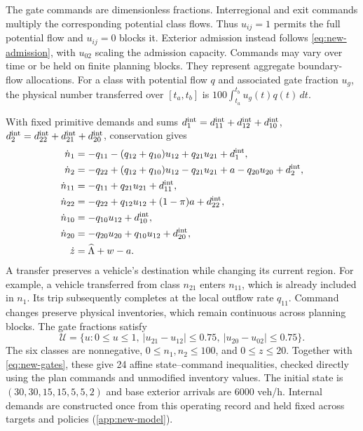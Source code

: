 \documentclass[preprint,12pt]{elsarticle}
\newcommand{\appref}[1]{\ref{#1}}
\begin{document}
The gate commands are dimensionless fractions. Interregional and exit
commands multiply the corresponding potential class flows. Thus $u_{ij}=1$
permits the full potential flow and $u_{ij}=0$ blocks it. Exterior
admission instead follows \eqref{eq:new-admission}, with $u_{02}$ scaling
the admission capacity. Commands may vary over time or be held on finite
planning blocks. They represent aggregate boundary-flow allocations.
For a class with potential flow $q$ and associated gate fraction $u_g$,
the physical number transferred over $[t_a,t_b]$ is
$100\int_{t_a}^{t_b}u_g(t)q(t)\,dt$.

With fixed primitive demands and sums
$d^{\rm int}_1=d^{\rm int}_{11}+d^{\rm int}_{12}+d^{\rm int}_{10}$, $d^{\rm int}_2=d^{\rm int}_{22}+d^{\rm int}_{21}+d^{\rm int}_{20}$, conservation gives
\begin{equation}
\begin{aligned}
\dot n_1&=-q_{11}-(q_{12}+q_{10})u_{12}+q_{21}u_{21}+d^{\rm int}_1,\\
\dot n_2&=-q_{22}+(q_{12}+q_{10})u_{12}-q_{21}u_{21}
                 +a-q_{20}u_{20}+d^{\rm int}_2,\\
\dot n_{11}&=-q_{11}+q_{21}u_{21}+d^{\rm int}_{11},\\
\dot n_{22}&=-q_{22}+q_{12}u_{12}+(1-\pi)a+d^{\rm int}_{22},\\
\dot n_{10}&=-q_{10}u_{12}+d^{\rm int}_{10},\\
\dot n_{20}&=-q_{20}u_{20}+q_{10}u_{12}+d^{\rm int}_{20},\\
\dot z&=\widehat\Lambda+w-a.
\end{aligned}
\label{eq:new-plant}
\end{equation}
A transfer preserves a vehicle's destination while changing its current
region. For example, a vehicle transferred from class $n_{21}$ enters
$n_{11}$, which is already included in $n_1$. Its trip subsequently
completes at the local outflow rate $q_{11}$. Command changes preserve
physical inventories, which remain continuous across planning blocks.
The gate fractions satisfy
\begin{equation}
\mathcal U=\{u:0\le u\le1,\ |u_{21}-u_{12}|\le0.75,
\ |u_{20}-u_{02}|\le0.75\}.
\label{eq:new-gates}
\end{equation}
The six classes are nonnegative, $0\le n_1,n_2\le100$, and $0\le z\le20$.
Together with \eqref{eq:new-gates}, these give 24 affine state--command
inequalities, checked directly using the plan commands and unmodified
inventory values.
The initial state is $(30,30,15,15,5,5,2)$ and base exterior arrivals are
6000 veh/h. Internal demands are constructed once from this operating
record and held fixed across targets and policies
(\appref{app:new-model}).
\end{document}
